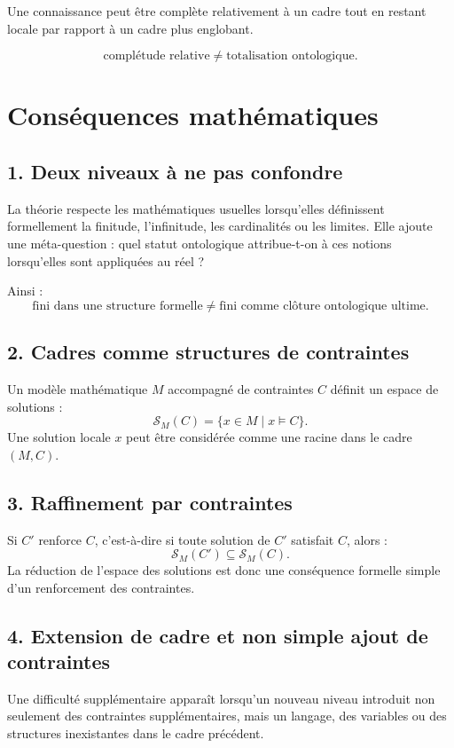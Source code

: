\documentclass[11pt,a4paper]{article}
\newcommand{\Sol}{\mathcal{S}}
\newcommand{\sat}{\models}
\begin{document}
Une connaissance peut être complète relativement à un cadre tout en restant
locale par rapport à un cadre plus englobant.

\[
\boxed{
\text{complétude relative}\neq\text{totalisation ontologique}.
}
\]

\section{Conséquences mathématiques}

\subsection{1. Deux niveaux à ne pas confondre}

La théorie respecte les mathématiques usuelles lorsqu'elles définissent
formellement la finitude, l'infinitude, les cardinalités ou les limites.
Elle ajoute une méta-question : quel statut ontologique attribue-t-on à ces
notions lorsqu'elles sont appliquées au réel ?

Ainsi :
\[
\boxed{
\text{fini dans une structure formelle}
\neq
\text{fini comme clôture ontologique ultime}.
}
\]

\subsection{2. Cadres comme structures de contraintes}

Un modèle mathématique \(M\) accompagné de contraintes \(C\) définit un espace
de solutions :
\[
\Sol_M(C)=\{x\in M\mid x\sat C\}.
\]
Une solution locale \(x\) peut être considérée comme une racine dans le
cadre \((M,C)\).

\subsection{3. Raffinement par contraintes}

Si \(C'\) renforce \(C\), c'est-à-dire si toute solution de \(C'\) satisfait
\(C\), alors :
\[
\boxed{
\Sol_M(C')\subseteq\Sol_M(C).
}
\]
La réduction de l'espace des solutions est donc une conséquence formelle
simple d'un renforcement des contraintes.

\subsection{4. Extension de cadre et non simple ajout de contraintes}

Une difficulté supplémentaire apparaît lorsqu'un nouveau niveau introduit
non seulement des contraintes supplémentaires, mais un langage, des variables
ou des structures inexistantes dans le cadre précédent.
\end{document}
